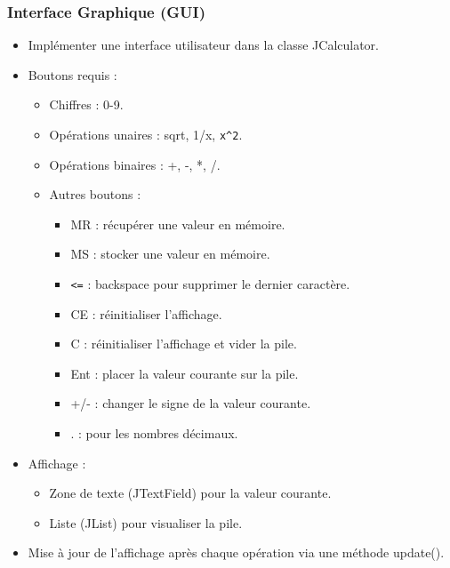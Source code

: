 \documentclass[12pt]{report}
\begin{document}
            \subsubsection*{Interface Graphique (GUI)}
                \begin{itemize}
                    \item Implémenter une interface utilisateur dans la classe JCalculator.
                    \item Boutons requis :
                    \begin{itemize}
                        \item Chiffres : 0-9.
                        \item Opérations unaires : sqrt, 1/x, \verb|x^2|.
                        \item Opérations binaires : +, -, *, /.
                        \item Autres boutons :
                        \begin{itemize}
                            \item MR : récupérer une valeur en mémoire.
                            \item MS : stocker une valeur en mémoire.
                            \item \verb|<=| : backspace pour supprimer le dernier caractère.
                            \item CE : réinitialiser l’affichage.
                            \item C : réinitialiser l’affichage et vider la pile.
                            \item Ent : placer la valeur courante sur la pile.
                            \item +/- : changer le signe de la valeur courante.
                            \item . : pour les nombres décimaux.
                        \end{itemize}
                    \end{itemize}

                    \item Affichage :
                    \begin{itemize}
                        \item Zone de texte (JTextField) pour la valeur courante.
                        \item Liste (JList) pour visualiser la pile.
                    \end{itemize}

                    \item Mise à jour de l'affichage après chaque opération via une méthode update().
                \end{itemize}
\end{document}
